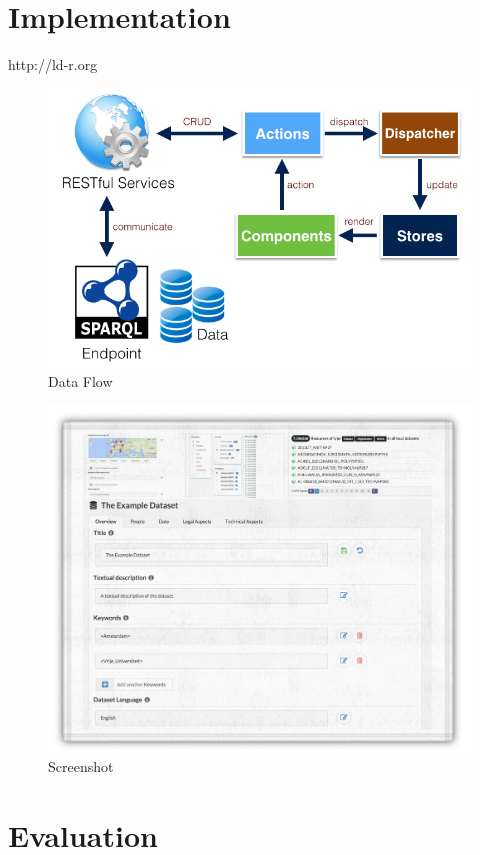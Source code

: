 \documentclass{acm_proc_article-sp}
\begin{document}
\section{Implementation}

http://ld-r.org


\begin{figure}[tb]
  \includegraphics[width=.9\linewidth]{images/dataflow.jpg}
  \caption{Data Flow}
\end{figure}

\begin{figure}[tb]
  \includegraphics[width=.9\linewidth]{images/screenshot.png}
  \caption{Screenshot}
\end{figure}

\section{Evaluation}
\end{document}
